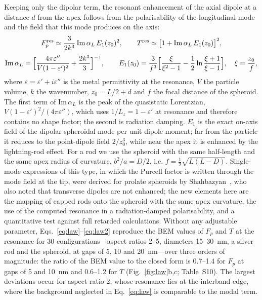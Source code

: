 \documentclass[11pt,a4paper]{article}
\newcommand{\Fp}{F_p}
\begin{document}
Keeping only the dipolar term, the resonant enhancement of the axial dipole at a distance $d$ from the apex follows
from the polarisability of the longitudinal mode and the field that this mode produces on the axis:
\begin{equation}
  \Fp^{\rm res}\simeq\frac{3}{2k^3}\,\mathrm{Im}\,\alpha_L\,E_1(z_0)^2,\qquad
  T^{\rm res}\simeq\bigl[1+\mathrm{Im}\,\alpha_L\,E_1(z_0)\bigr]^2,
  \label{eq:law}
\end{equation}
\begin{equation}
  \mathrm{Im}\,\alpha_L=\Bigl[\frac{4\pi\varepsilon''}{V(1-\varepsilon')^2}+\frac{2k^3}{3}\Bigr]^{-1},\qquad
  E_1(z_0)=\frac{3}{f^3}\Bigl[\frac{\xi}{\xi^2-1}-\frac12\ln\frac{\xi+1}{\xi-1}\Bigr],\quad \xi=\frac{z_0}{f},
  \label{eq:law2}
\end{equation}
where $\varepsilon=\varepsilon'+i\varepsilon''$ is the metal permittivity at the resonance, $V$ the particle volume,
$k$ the wavenumber, $z_0=L/2+d$ and $f$ the focal distance of the spheroid. The first term of $\mathrm{Im}\,\alpha_L$ is
the peak of the quasistatic Lorentzian, $V(1-\varepsilon')^2/(4\pi\varepsilon'')$, which uses
$1/L_z=1-\varepsilon'$ at resonance and therefore contains no shape factor; the second is radiation damping.
$E_1$ is the exact on-axis field of the dipolar spheroidal mode per unit dipole moment; far from the particle it
reduces to the point-dipole field $2/z_0^3$, while near the apex it is enhanced by the lightning-rod effect. For a
rod we use the spheroid with the same half-length and the same apex radius of curvature, $b^2/a=D/2$, i.e.
$f=\tfrac12\sqrt{L(L-D)}$. Single-mode expressions of this type, in which the Purcell factor is written through the
mode field at the tip, were derived for prolate spheroids by Shahbazyan~\cite{shahbazyan2016,shahbazyan2018}, who
also noted that transverse dipoles are not enhanced; the new elements here are the mapping of capped rods onto the
spheroid with the same apex curvature, the use of the computed resonance in a radiation-damped polarisability, and a
quantitative test against full retarded calculations. Without any adjustable parameter, Eqs.~\eqref{eq:law}--\eqref{eq:law2} reproduce the BEM
values of $\Fp$ and $T$ at the resonance for 30 configurations---aspect ratios 2--5, diameters 15--\SI{30}{nm}, a
silver rod and the spheroid, at gaps of 5, 10 and \SI{20}{nm}---over three orders of magnitude: the ratio of the BEM value to the closed form is 0.7--1.4 for $\Fp$ at gaps of 5 and
\SI{10}{nm} and 0.6--1.2 for $T$ (Fig.~\ref{fig:law}b,c; Table~S10). The largest deviations occur for aspect ratio 2, whose resonance lies at the interband
edge, where the background neglected in Eq.~\eqref{eq:law} is comparable to the modal term.
\end{document}
